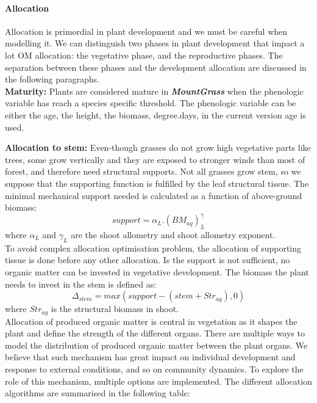 \documentclass[a4paper,twoside, justified,marginals=raggedright]{tufte-handout}
\newcommand{\model}{\textit{\textbf{MountGrass }}}
\begin{document}
\paragraph{Allocation} \label{par:allocation}
Allocation is primordial in plant development and we must be careful when modelling it. We can distinguish two phases in plant development that impact a lot OM allocation: the vegetative phase, and the reproductive phases. The separation between these phases and the development allocation are discussed in the following paragraphs.\\

\textbf{Maturity:} Plants are considered mature in \model when the phenologic variable has reach a species specific threshold. The phenologic variable can be either the age, the height, the biomass, degree.days, in the current version age is used.\\
\indent 

\textbf{Allocation to stem:} Even-though grasses do not grow high vegetative parts like trees, some grow vertically and they are exposed to stronger winds than most of forest, and therefore need structural supports. Not all grasses grow stem, so we suppose that the supporting function is fulfilled by the leaf structural tissue. The minimal mechanical support needed is calculated as a function of above-ground biomass:
\begin{equation}
support = \alpha_{L} . (BM_{ag})^\gamma_{L}
\end{equation}
where $\alpha_{L}$ and $\gamma_{L}$ are the shoot allometry and shoot allometry exponent.\\
\indent To avoid complex allocation optimisation problem, the allocation of supporting tissue is done before any other allocation. Is the support is not sufficient, no organic matter can be invested in vegetative development. The biomass the plant needs to invest in the stem is defined as:
\begin{equation}
\Delta_{stem} = max(support - (stem + Str_{ag}), 0)
\end{equation}
where $Str_{ag}$ is the structural biomass in shoot.\\

\indent Allocation of produced organic matter is central in vegetation as it shapes the plant and define the strength of the different organs. There are multiple ways to model the distribution of produced organic matter between the plant organs. We believe that such mechanism has great impact on individual development and response to external conditions, and so on community dynamics. To explore the role of this mechanism, multiple options are implemented. The different allocation algorithms are summarised in the following table:
\end{document}
